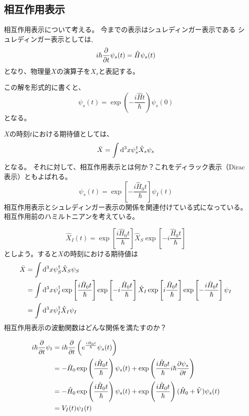 \documentclass[titlepage]{ltjsarticle}
\begin{document}
\subsection{相互作用表示}
相互作用表示について考える。
今までの表示はシュレディンガー表示である
シュレディンガー表示としては,
\begin{equation}
  i \hbar \pdv{}{t} \psi_s(t) = \hat{H} \psi_s(t)
\end{equation}
となり、物理量\(X\)の演算子を\(X_s\)と表記する。

この解を形式的に書くと、
\begin{equation}
  \psi_s(t) = \exp \left( - \frac{i \hat{H} t}{\hbar} \right) \psi_s(0)
\end{equation}
となる。

\(X\)の時刻\(t\)における期待値としては、
\begin{equation}
  \bar{X} = \int \odif[order=3]{x} \psi^\dagger_s \hat{X}_s \psi_s
\end{equation}
となる。
それに対して、相互作用表示とは何か？これをディラック表示（Dirac表示）ともよばれる。
\begin{equation}
  \psi_s(t) = \exp\left[ -\frac{i \hat{H}_0 t}{\hbar} \right]\psi_I(t)
\end{equation}
相互作用表示とシュレディンガー表示の関係を関連付けている式になっている。相互作用前のハミルトニアンを考えている。

\begin{equation}
  \hat{X}_I(t) = \exp\left[ \frac{i \hat{H}_0 t}{\hbar} \right]\hat{X}_S \exp \left[ -i \frac{\hat{H}_0 t}{\hbar} \right]
\end{equation}
としよう。すると\(X\)の時刻における期待値は
\begin{align}
  \bar{X} &  = \int \odif[order=3]{x} \psi^\dagger_S \hat{X}_S \psi_S\\
  & = \int \odif[order=3]{x} \psi^\dagger_I \exp\left[ \frac{i \hat{H}_0 t}{\hbar} \right]\exp \left[ -i \frac{\hat{H}_0 t}{\hbar} \right] \hat{X}_I \exp \left[ i \frac{\hat{H}_0 t}{\hbar} \right] \exp\left[ -\frac{i \hat{H}_0 t}{\hbar} \right]\psi_I\\
  & = \int \odif[order=3]{x} \psi^\dagger_I \hat{X}_I \psi_I
\end{align}
相互作用表示の波動関数はどんな関係を満たすのか？

\begin{align}
  i \hbar \pdv{}{t} \psi_t & = i \hbar \pdv{}{t} \left( e^{\frac{i \hat{H}_0 t}{\hbar}} \psi_s(t) \right)\\
  & = - \hat{H}_0 \exp \left( \frac{i  \hat{H}_0 t}{\hbar} \right)\psi_s(t) + \exp\left( \frac{i \hat{H}_0 t}{\hbar} i \hbar \pdv{\psi_s}{t} \right)\\
  & = - \hat{H}_0 \exp \left( \frac{i  \hat{H}_0 t}{\hbar} \right)\psi_s(t) + \exp\left( \frac{i \hat{H}_0 t}{\hbar}\right)(\hat{H}_0 + \hat{V})\psi_s(t)\\
  & = V_I(t) \psi_I(t) 
\end{align}
\end{document}
